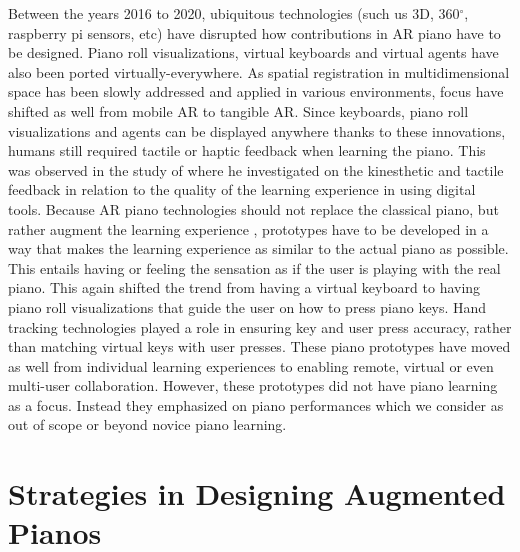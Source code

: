 \documentclass[sigchi, review]{acmart}
\begin{document}
Between the years 2016 to 2020, ubiquitous technologies (such us 3D, 360$^{\circ}$, raspberry pi sensors, etc) have disrupted how contributions in AR piano have to be designed. Piano roll visualizations, virtual keyboards and virtual agents have also been ported virtually-everywhere. As spatial registration in multidimensional space has been slowly addressed \cite{roberts2011spatial,novotny2013applications, billinghurst2008tangible} and applied in various environments, focus have shifted as well from mobile AR to tangible AR. Since keyboards, piano roll visualizations and agents can be displayed anywhere thanks to these innovations, humans still required tactile or haptic feedback when learning the piano. This was observed in the study of \citet{hamam2013effect} where he investigated on the kinesthetic and tactile feedback in relation to the quality of the learning experience in using digital tools. Because AR piano technologies should not replace the classical piano, but rather augment the learning experience \cite{yang2020modern}, prototypes have to be developed in a way that makes the learning experience as similar to the actual piano as possible. This entails having or feeling the sensation as if the user is playing with the real piano. This again shifted the trend from having a virtual keyboard to having piano roll visualizations that guide the user on how to press piano keys. Hand tracking technologies played a role in ensuring key and user press accuracy, rather than matching virtual keys with user presses. These piano prototypes have moved as well from individual learning experiences to enabling remote, virtual or even multi-user collaboration. However, these prototypes did not have piano learning as a focus. Instead they emphasized on piano performances which we consider as out of scope or beyond novice piano learning. 

\section{Strategies in Designing Augmented Pianos}
\label{sec: strat}
\end{document}

